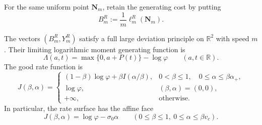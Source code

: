 For the same uniform point \(\mathbf N_m\), retain the generating cost by
putting
\[
 B_m^R:=\frac1m\ell_m^R(\mathbf N_m).
\]

\begin{theorem}
\label{thm:joint-cost-reward-ldp}
The vectors \((B_m^R,Y_m^R)\) satisfy a full large deviation principle on
\(\mathbb R^2\) with speed \(m\).  Their limiting logarithmic moment generating
function is
\begin{equation}
 \Lambda(a,t)=\max\{0,a+P(t)\}-\log\varphi
 \qquad(a,t\in\mathbb R).
 \label{eq:joint-cost-reward-log-mgf}
\end{equation}
The good rate function is
\begin{equation}
 J(\beta,\alpha)=
 \begin{cases}
  (1-\beta)\log\varphi+\beta I(\alpha/\beta),
   &0<\beta\le1,\quad 0\le\alpha\le\beta\alpha_+,\\
  \log\varphi,&(\beta,\alpha)=(0,0),\\
  +\infty,&\text{otherwise}.
 \end{cases}
 \label{eq:joint-cost-reward-rate}
\end{equation}
In particular, the rate surface has the affine face
\begin{equation}
 J(\beta,\alpha)=\log\varphi-\sigma_0\alpha
 \qquad(0\le\beta\le1,\ 0\le\alpha\le\beta v_c).
 \label{eq:joint-cost-reward-flat-face}
\end{equation}
\end{theorem}

